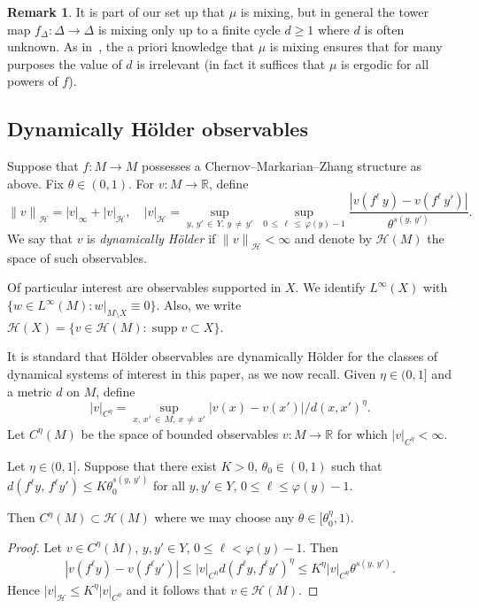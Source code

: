 \documentclass[10pt]{amsart}
\theoremstyle{definition}\newtheorem{defi}[theo]{Definition}\newtheorem{rema}[theo]{Remark}\newtheorem{exam}[theo]{Example}\newtheorem{exem}[theo]{Example}\newtheorem{nota}[theo]{Notation}
\newcommand{\R}{\mathbb{R}}
\newcommand{\cH}{\mathcal{H}}
\DeclareMathOperator{\supp}{supp}
\begin{document}
\begin{rema}\label{rmk:d}
It is part of our set up that $\mu$ is mixing, but in general the tower map $f_\Delta:\Delta\to\Delta$ is mixing only up to a finite cycle $d\ge1$ where $d$ is often unknown. As in~\cite[Theorem~2.1, Proposition~10.1]{Chernov99}, the a priori knowledge that $\mu$ is mixing ensures that for many purposes the value of $d$ is irrelevant (in fact it suffices that $\mu$ is ergodic for all powers of $f$).
\end{rema}

\subsection{Dynamically H\"older observables}

Suppose that $f:M\to M$ possesses a Chernov--Markarian--Zhang structure as above. Fix $\theta\in(0,1)$. For $v:M\to\R$, define
\begin{equation}\label{eq:dyn}
{\|v\|}_\cH=|v|_\infty+{|v|}_\cH, \quad {|v|}_\cH=\sup_{y,\,y'\,\in\,Y,\,y\,\neq\,y'}\;\sup_{0\,\le\,\ell\,\le\,\varphi(y)-1}\frac{|v(f^\ell\,y)-v(f^\ell\,y')|}{\theta^{s(y,\,y')}}.
\end{equation}
We say that $v$ is \emph{dynamically H\"older} if ${\|v\|}_\cH<\infty$ and denote by $\cH(M)$ the space of such observables.


Of particular interest are observables supported in $X$. We identify $L^\infty(X)$ with $\{w\in L^\infty(M):w|_{M\setminus X}\equiv0\}$. Also, we write $\cH(X)=\{v\in \cH(M):\supp v\subset X\}$.

It is standard that H\"older observables are dynamically H\"older for the classes of dynamical systems of interest in this paper, as we now recall. Given $\eta\in(0,1]$ and a metric $d$ on $M$, define
\[
{|v|}_{C^\eta}=\sup_{x,\,x'\,\in\,M,\,x\,\neq\,x'}|v(x)-v(x')|/d(x,x')^\eta.
\]
Let $C^\eta(M)$ be the space of bounded observables $v:M\to\R$ for which ${|v|}_{C^\eta}<\infty$.

\begin{prop}\label{prop:dyn}
Let $\eta\in(0,1]$. Suppose that there exist $K>0$, $\theta_0\in(0,1)$ such that $d(f^\ell y,\,f^\ell y')\le K\theta_0^{s(y,\,y')}$ for all $y,y'\in Y$, $0\le\ell\le \varphi(y)-1$.

Then $C^\eta(M)\subset \cH(M)$ where we may choose any $\theta\in[\theta_0^\eta,1)$.
\end{prop}

\begin{proof}
Let $v\in C^\eta(M)$, $y,y'\in Y$, $0\le\ell<\varphi(y)-1$. Then
\begin{align*}
\left|v\left(f^\ell y\right)- v\left(f^\ell y'\right)\right|
\le {|v|}_{C^\eta}d\left(f^\ell y,f^\ell y'\right)^\eta
\le K^\eta {|v|}_{C^\eta} \theta^{s(y,\,y')}.
\end{align*}
Hence ${|v|}_{\cH}\le K^\eta {|v|}_{C^\eta}$ and it follows that $v\in \cH(M)$.
\end{proof}
\end{document}
